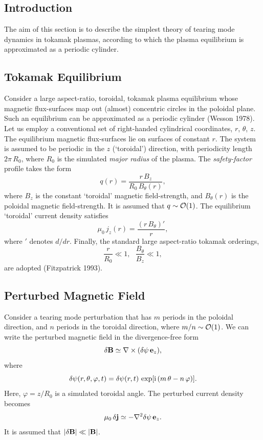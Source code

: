 \documentclass[notitlepage,12pt]{article}
\begin{document}
\subsection{Introduction}
The aim of this section is to describe the simplest theory of tearing mode dynamics in tokamak plasmas, according to which the plasma
equilibrium is approximated as a periodic cylinder. 

\subsection{Tokamak Equilibrium}
Consider a large aspect-ratio, toroidal,  tokamak plasma equilibrium whose magnetic flux-surfaces map out (almost) concentric circles in the poloidal plane. Such an equilibrium can be approximated as a periodic cylinder (Wesson 1978). 
Let us employ a conventional set of right-handed cylindrical coordinates, $r$, $\theta$, $z$. The
equilibrium magnetic flux-surfaces lie on surfaces of constant $r$. The system is
assumed to be periodic in the $z$ (`toroidal') direction, with periodicity length $2\pi\,R_0$, 
where $R_0$ is the simulated {\em major radius}\/ of the plasma. The {\em safety-factor}\/ profile takes the form
\begin{equation}\label{e90}
q(r)= \frac{r\,B_z}{R_0\,B_\theta(r)},
\end{equation}
where $B_z$ is the constant `toroidal' magnetic field-strength, and $B_\theta(r)$ is
the poloidal magnetic field-strength. It is assumed that $q\sim{\cal O}(1)$. 
The equilibrium `toroidal' current density
satisfies
\begin{equation}
\mu_0\,j_z(r) = \frac{(r\,B_\theta)'}{r},
\end{equation}
where $'$ denotes $d/dr$. Finally, the standard large aspect-ratio
tokamak orderings,  
\begin{equation}\label{e92}
\frac{r}{R_0}\ll 1,~~~ \frac{B_\theta}{B_z}\ll 1,
\end{equation}
are adopted (Fitzpatrick 1993). 

\subsection{Perturbed Magnetic Field}
Consider a tearing mode perturbation that has $m$ periods in the poloidal direction,
and $n$ periods in the toroidal direction, where $m/n\sim {\cal O}(1)$.  We can write the perturbed magnetic field in the divergence-free form
\begin{equation}\label{e93}
\delta{\bf B} \simeq \nabla\times (\delta\psi\,{\bf e}_z),
\end{equation}
where
\begin{equation}\label{e93a}
\delta\psi(r,\theta,\varphi,t)= \delta\psi(r,t)\,\exp[{\rm i}\,(m\,\theta-n\,\varphi)].
\end{equation}
Here, $\varphi=z/R_0$ is a simulated toroidal angle. The perturbed current density becomes
\begin{equation}\label{e94}
\mu_0\,\delta {\bf j} \simeq - \nabla^2\delta\psi\,{\bf e}_z.
\end{equation}
It is assumed that $|\delta{\bf B}|\ll |{\bf B}|$. 
\end{document}
